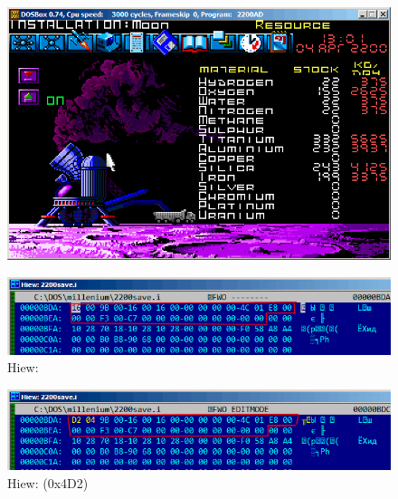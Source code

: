 \begin{figure}[H]
\centering
\includegraphics[scale=\FigScale]{ff/millenium/2.png}
\caption{}
\label{fig:mill_2}
\end{figure}

\begin{figure}[H]
\centering
\includegraphics[scale=\FigScale]{ff/millenium/hiew3.png}
\caption{Hiew: }
\label{fig:mill_hiew3}
\end{figure}

\begin{figure}[H]
\centering
\includegraphics[scale=\FigScale]{ff/millenium/hiew4.png}
\caption{Hiew:  (0x4D2)}
\label{fig:mill_hiew4}
\end{figure}

